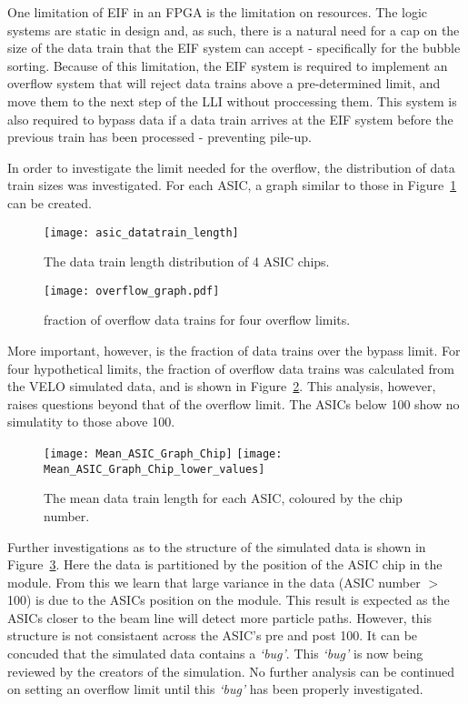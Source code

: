 		One limitation of EIF in an FPGA is the limitation on resources. 
		The logic systems are static in design and, as such, there is a natural need for a cap on the size of the data train that the EIF system can accept - specifically for the bubble sorting.
		Because of this limitation, the EIF system is required to implement an overflow system that will reject data trains above a pre-determined limit, and move them to the next step of the LLI without proccessing them.
		This system is also required to bypass data if a data train arrives at the EIF system before the previous train has been processed - preventing pile-up.
		\par
		In order to investigate the limit needed for the overflow, the distribution of data train sizes was investigated. For each ASIC, a graph similar to those in Figure~\ref{fig:asic_datatrain} can be created.

		\begin{figure}[h]
			\centering
			\texttt{[image: asic\_datatrain\_length]}
			\caption{The data train length distribution of 4 ASIC chips.}
			\label{fig:asic_datatrain}
		\end{figure}
		\par
		\begin{figure}[h]
			\centering
			\texttt{[image: overflow\_graph.pdf]}
			\caption{fraction of overflow data trains for four overflow limits.}
			\label{fig:overflow_franction}
		\end{figure}\FloatBarrier
		More important, however, is the fraction of data trains over the bypass limit.
		For four hypothetical limits, the fraction of overflow data trains was calculated from the VELO simulated data, and is shown in Figure~\ref{fig:overflow_franction}.
		This analysis, however, raises questions beyond that of the overflow limit.
		The ASICs below 100 show no simulatity to those above 100.

		\begin{figure}[h]
			\centering
			\texttt{[image: Mean\_ASIC\_Graph\_Chip]}
			\texttt{[image: Mean\_ASIC\_Graph\_Chip\_lower\_values]}
			\caption{The mean data train length for each ASIC, coloured by the chip number.}
			\label{fig:asic_structure}
		\end{figure}\FloatBarrier
		Further investigations as to the structure of the simulated data is shown in Figure~\ref{fig:asic_structure}.
		Here the data is partitioned by the position of the ASIC chip in the module.
		From this we learn that large variance in the data (ASIC number $>$ 100) is due to the ASICs position on the module.
		This result is expected as the ASICs closer to the beam line will detect more particle paths.
		However, this structure is not consistaent across the ASIC's pre and post 100.
		It can be concuded that the simulated data contains a \textit{`bug'}.
		This \textit{`bug'} is now being reviewed by the creators of the simulation. 
		No further analysis can be continued on setting an overflow limit until this \textit{`bug'} has been properly investigated.

